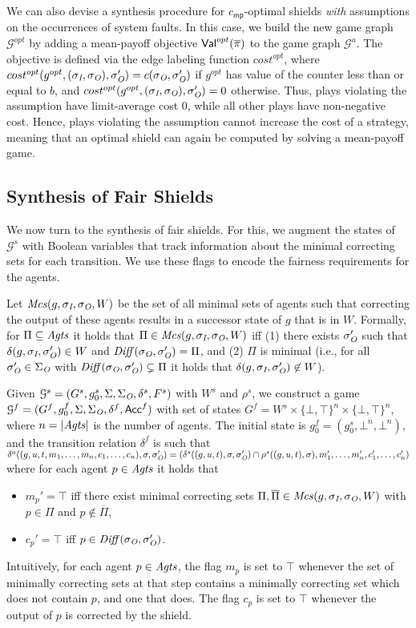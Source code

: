 We can also devise a synthesis procedure for $c_{\mathsf{mp}}$-optimal shields \emph{with} assumptions on the occurrences of system faults. In this case, we build the new game graph $\mathcal G^{opt}$ by adding a mean-payoff objective $\mathsf{Val}^{opt}(\overline{\pi})$ to the game graph $\mathcal G^{a}$. The objective is defined via the edge labeling function $cost^{opt}$, where $cost^{opt}(g^{opt},(\sigma_{\textit{I}},\sigma_{\textit{O}}),\sigma_{\textit{O}}') = c(\sigma_{\textit{O}},\sigma_{\textit{O}}')$ if $g^{opt}$ has value of the counter less than or equal to $b$, and $cost^{opt}(g^{opt},(\sigma_{\textit{I}},\sigma_{\textit{O}}),\sigma_{\textit{O}}') = 0$ otherwise. Thus, plays violating the assumption  have limit-average cost $0$, while all other plays have non-negative cost. Hence, plays violating the assumption cannot increase the cost of a strategy, meaning that an optimal shield can again be computed by solving a mean-payoff game.
\fi

\subsection{Synthesis of Fair Shields}
We now turn to the synthesis of fair shields. For this, we augment the states of $\mathcal G^s$  with Boolean variables that track information about the minimal correcting sets for each transition.  We use these flags to encode the fairness requirements for the  agents.

Let $\mathit{Mcs}(g,\sigma_{\textit{I}},\sigma_{\textit{O}},W)$ be the set of all minimal sets of agents such that correcting the output of these agents results in a successor state of $g$ that is in $W$.
Formally, for $\Pi \subseteq \mathit{Agts}$ it holds that $\Pi \in \mathit{Mcs}(g,\sigma_{\textit{I}},\sigma_{\textit{O}},W)$ iff (1) there exists $\sigma_{\textit{O}}'$ such that $\delta(g,\sigma_{\textit{I}},\sigma_{\textit{O}}') \in W$ and $\mathit{Diff}(\sigma_{\textit{O}},\sigma_{\textit{O}}') = \Pi$, and (2) $\Pi$ is minimal
(i.e., for all $\sigma_{\textit{O}}' \in\Sigma_{\textit{O}}$ with $\mathit{Diff}(\sigma_{\textit{O}},\sigma_{\textit{O}}') \subsetneq \Pi$ it holds that $\delta(g,\sigma_{\textit{I}},\sigma_{\textit{O}}') \not\in W$).

Given  $\mathcal G^s = (G^s, g_0^s,\Sigma,\Sigma_{\textit{O}},\delta^s,F^s)$ with $W^s$ and $\rho^s$,
we construct a game $\mathcal G^{f} = (G^f, g_0^f,\Sigma,\Sigma_{\textit{O}},\delta^{f}, \mathsf{Acc}^{f})$ with
set of states $G^f = W^s \times \{\bot,\top\}^n\times \{\bot,\top\}^n$, where $n = |\mathit{Agts}|$ is the number of agents.
The initial state is $g_0^f = (g_0^s,\bot^n,\bot^n)$, and
the transition relation $\delta^{f}$ is such that
%
$\delta^{a}((g,u,t,m_1,\ldots,m_n,c_1,\ldots,c_n),\sigma,\sigma_{\textit{O}}')=(\delta^s((g,u,t), \sigma,\sigma_{\textit{O}}')\cap\rho^s((g,u,t), \sigma),m_1',\ldots,m_n',c_1',\ldots,c_n')$ where for each agent $p \in \mathit{Agts}$ it holds that
\begin{itemize}
\item $m_p'= \top$ iff there exist minimal correcting sets $\Pi,\overline \Pi\in \mathit{Mcs}(g,\sigma_{\textit{I}},\sigma_{\textit{O}},W)$  with $p \in \Pi$ and $p \not \in \overline \Pi$, 
\item $c_p' = \top$ iff $p\in \mathit{Diff}(\sigma_{\textit{O}}, \sigma_{\textit{O}}')$.
\end{itemize}
Intuitively, for each agent $p \in \mathit{Agts}$, the  flag $m_p$ is set to $\top$ whenever the set of  minimally correcting sets at that step contains a  minimally correcting set which does not contain $p$, and one that does. The flag $c_p$ is set to $\top$ whenever the output of $p$ is corrected by the shield.

